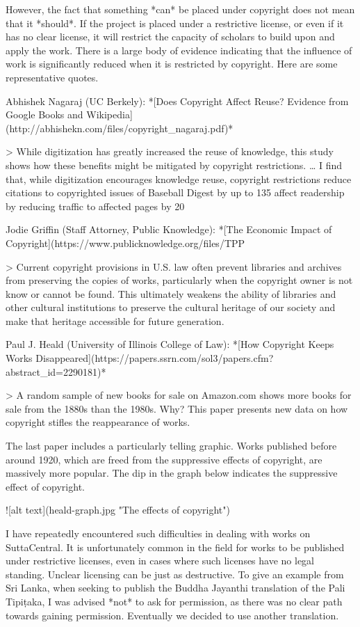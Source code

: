 \documentclass[11pt, openany,a5paper]{article}
\begin{document}
\begin{markdown}
However, the fact that something *can* be placed under copyright does not mean that it *should*. If the project is placed under a restrictive license, or even if it has no clear license, it will restrict the capacity of scholars to build upon and apply the work. There is a large body of evidence indicating that the influence of work is significantly reduced when it is restricted by copyright. Here are some representative quotes.

Abhishek Nagaraj (UC Berkely): *[Does Copyright Affect Reuse? Evidence from Google Books and Wikipedia](http://abhishekn.com/files/copyright_nagaraj.pdf)*

> While digitization has greatly increased the reuse of knowledge, this study
shows how these benefits might be mitigated by copyright restrictions. … I find that, while digitization encourages knowledge reuse, copyright restrictions reduce citations to copyrighted issues of Baseball Digest by up to 135%
affect readership by reducing traffic to affected pages by 20%

Jodie	Griffin (Staff Attorney, Public Knowledge): *[The Economic Impact of Copyright](https://www.publicknowledge.org/files/TPP%

> Current copyright provisions in U.S. law often prevent libraries and archives from preserving the copies of works, particularly when the copyright owner is not know or cannot be found. This ultimately weakens the ability of libraries and other cultural institutions to preserve the cultural heritage of our society and make that heritage accessible for future generation.

Paul J. Heald (University of Illinois College of Law): *[How Copyright Keeps Works Disappeared](https://papers.ssrn.com/sol3/papers.cfm?abstract_id=2290181)*

> A random sample of new books for sale on Amazon.com shows more books for sale from the 1880s than the 1980s. Why? This paper presents new data on how copyright stifles the reappearance of works.

The last paper includes a particularly telling graphic. Works published before around 1920, which are freed from the suppressive effects of copyright, are massively more popular. The dip in the graph below indicates the suppressive effect of copyright.

![alt text](heald-graph.jpg "The effects of copyright")

I have repeatedly encountered such difficulties in dealing with works on SuttaCentral. It is unfortunately common in the field for works to be published under restrictive licenses, even in cases where such licenses have no legal standing. Unclear licensing can be just as destructive. To give an example from Sri Lanka, when seeking to publish the Buddha Jayanthi translation of the Pali Tipiṭaka, I was advised *not* to ask for permission, as there was no clear path towards gaining permission. Eventually we decided to use another translation.


\end{markdown}
\end{document}
